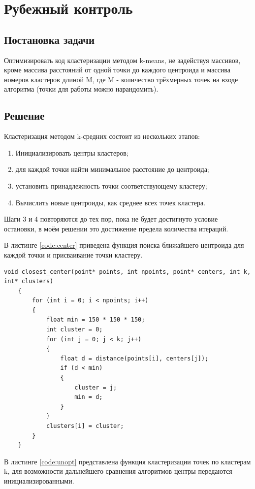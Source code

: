 \chapter{Рубежный контроль}
\label{cha:analysis}

\section{Постановка задачи}
\label{sec:task}
Оптимизировать код кластеризации методом k-means, не задействуя массивов, кроме массива расстояний от одной точки до каждого центроида и массива номеров кластеров длиной M, где M - количество трёхмерных точек на входе алгоритма (точки для работы можно нарандомить).

\section{Решение}
\label{sec:solution}
Кластеризация методом k-средних состоит из нескольких этапов:
\begin{enumerate}
	\item Инициализировать центры кластеров;
	\item для каждой точки найти минимальное расстояние до центроида;
	\item установить принадлежность точки соответствующему кластеру;
	\item Вычислить новые центроиды, как среднее всех точек кластера.
\end{enumerate}
Шаги 3 и 4 повторяются до тех пор, пока не будет достигнуто условие остановки, в моём решении это достижение предела количества итераций.
\par В листинге \ref{code:center} приведена функция поиска ближайшего центроида для каждой точки и присваивание точки кластеру.
\begin{lstlisting}[caption= Функция поиска ближайшего центроида, label=code:center]
	void closest_center(point* points, int npoints, point* centers, int k, int* clusters)
	{
		for (int i = 0; i < npoints; i++)
		{
			float min = 150 * 150 * 150;
			int cluster = 0;
			for (int j = 0; j < k; j++)
			{
				float d = distance(points[i], centers[j]);
				if (d < min)
				{
					cluster = j;
					min = d;
				}
			}
			clusters[i] = cluster;
		}
	}
\end{lstlisting}
В листинге \ref{code:unopt} представлена функция кластеризации точек по кластерам k, для возможности дальнейшего сравнения алгоритмов центры передаются инициализированными.
